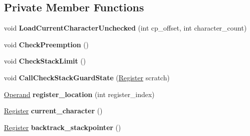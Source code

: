 \subsection*{Private Member Functions}
\begin{DoxyCompactItemize}
\item 
void {\bfseries Load\+Current\+Character\+Unchecked} (int cp\+\_\+offset, int character\+\_\+count)\hypertarget{classv8_1_1internal_1_1_reg_exp_macro_assembler_i_a32_aa882656b3d40148a03a7a2b6f920fe6c}{}\label{classv8_1_1internal_1_1_reg_exp_macro_assembler_i_a32_aa882656b3d40148a03a7a2b6f920fe6c}

\item 
void {\bfseries Check\+Preemption} ()\hypertarget{classv8_1_1internal_1_1_reg_exp_macro_assembler_i_a32_a850ce37a2388502a4ecb2aa33e103b0a}{}\label{classv8_1_1internal_1_1_reg_exp_macro_assembler_i_a32_a850ce37a2388502a4ecb2aa33e103b0a}

\item 
void {\bfseries Check\+Stack\+Limit} ()\hypertarget{classv8_1_1internal_1_1_reg_exp_macro_assembler_i_a32_a108044d513d6a119cefe6295a4fe2abe}{}\label{classv8_1_1internal_1_1_reg_exp_macro_assembler_i_a32_a108044d513d6a119cefe6295a4fe2abe}

\item 
void {\bfseries Call\+Check\+Stack\+Guard\+State} (\hyperlink{structv8_1_1internal_1_1_register}{Register} scratch)\hypertarget{classv8_1_1internal_1_1_reg_exp_macro_assembler_i_a32_a188741cc9e5d29de9ab178564c73af89}{}\label{classv8_1_1internal_1_1_reg_exp_macro_assembler_i_a32_a188741cc9e5d29de9ab178564c73af89}

\item 
\hyperlink{classv8_1_1internal_1_1_operand}{Operand} {\bfseries register\+\_\+location} (int register\+\_\+index)\hypertarget{classv8_1_1internal_1_1_reg_exp_macro_assembler_i_a32_a4d5ef25673f2f6f60c7b96da1e673d25}{}\label{classv8_1_1internal_1_1_reg_exp_macro_assembler_i_a32_a4d5ef25673f2f6f60c7b96da1e673d25}

\item 
\hyperlink{structv8_1_1internal_1_1_register}{Register} {\bfseries current\+\_\+character} ()\hypertarget{classv8_1_1internal_1_1_reg_exp_macro_assembler_i_a32_a659d49feaf06c010c6d944dd26b9964e}{}\label{classv8_1_1internal_1_1_reg_exp_macro_assembler_i_a32_a659d49feaf06c010c6d944dd26b9964e}

\item 
\hyperlink{structv8_1_1internal_1_1_register}{Register} {\bfseries backtrack\+\_\+stackpointer} ()\hypertarget{classv8_1_1internal_1_1_reg_exp_macro_assembler_i_a32_ac34ac83e87b2e3faad4ff14b89e45c6a}{}\label{classv8_1_1internal_1_1_reg_exp_macro_assembler_i_a32_ac34ac83e87b2e3faad4ff14b89e45c6a}


\end{DoxyCompactItemize}
